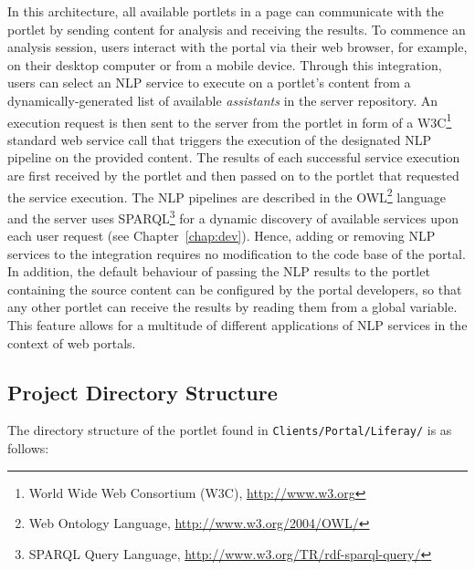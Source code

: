 In this architecture, all available portlets in a page can communicate with the \sa portlet by sending content for analysis and receiving the results. To commence an analysis session, users interact with the portal via their web browser, for example, on their desktop computer or from a mobile device. Through this integration, users can select an NLP service to execute on a portlet's content from a dynamically-generated list of available \emph{assistants} in the \sa server repository. An execution request is then sent to the \sa server from the \sa portlet in form of a W3C\footnote{World Wide Web Consortium (W3C), \url{http://www.w3.org}} standard web service call that triggers the execution of the designated NLP pipeline on the provided content. The results of each successful service execution are first received by the \sa portlet and then passed on to the portlet that requested the service execution. The NLP pipelines are described in the OWL\footnote{Web Ontology Language, \url{http://www.w3.org/2004/OWL/}} language and the \sa server uses SPARQL\footnote{SPARQL Query Language, \url{http://www.w3.org/TR/rdf-sparql-query/}} for a dynamic discovery of available services upon each user request (see Chapter~\ref{chap:dev}). Hence, adding or removing NLP services to the integration requires no modification to the code base of the portal. In addition, the default behaviour of passing the NLP results to the portlet containing the source content can be configured by the portal developers, so that any other portlet can receive the results by reading them from a global variable. This feature allows for a multitude of different applications of NLP services in the context of web portals.

\subsection{Project Directory Structure}
The directory structure of the \sa portlet found in \texttt{Clients/Portal/Liferay/} is as follows:

